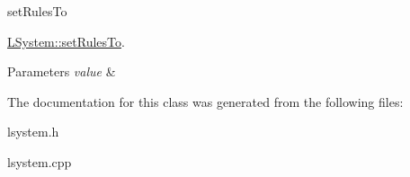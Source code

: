 set\+Rules\+To 

\hyperlink{classLSystem_a803c72892ac4cb38f080b9a131235d7e}{L\+System\+::set\+Rules\+To}.


\begin{DoxyParams}{Parameters}
{\em value} & \\
\hline
\end{DoxyParams}


The documentation for this class was generated from the following files\+:\begin{DoxyCompactItemize}
\item 
lsystem.\+h\item 
lsystem.\+cpp\end{DoxyCompactItemize}
